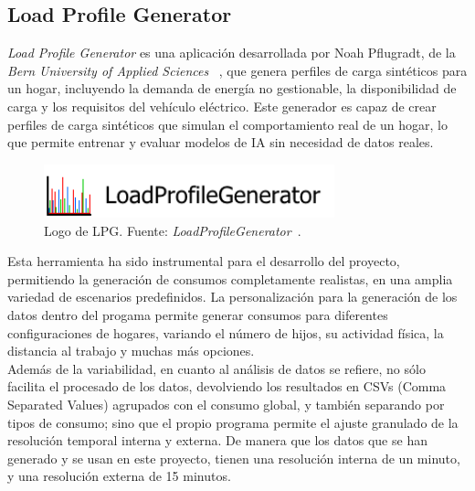 \subsection{Load Profile Generator}
\textit{Load Profile Generator} es una aplicación desarrollada por Noah Pflugradt, de la 
\textit{Bern University of Applied Sciences}~\cite{pflugradt2020loadprofile}
, que genera perfiles de carga sintéticos para un hogar, incluyendo la demanda de energía 
no gestionable, la disponibilidad de carga y los requisitos del vehículo eléctrico. Este 
generador es capaz de crear perfiles de carga sintéticos que simulan el comportamiento 
real de un hogar, lo que permite entrenar y evaluar modelos de IA sin necesidad de datos 
reales.
\begin{figure}[ht]
    \centering
    \includegraphics[width=0.75\textwidth]{images/lpg_logo.png}
    \caption{Logo de LPG. Fuente: \textit{LoadProfileGenerator}~\cite{pflugradt2020loadprofile}.}
    \label{fig:lpg_logo}
\end{figure}

Esta herramienta ha sido instrumental para el desarrollo del proyecto, permitiendo la generación
de consumos completamente realistas, en una amplia variedad de escenarios predefinidos. La 
personalización para la generación de los datos dentro del progama permite generar consumos para
diferentes configuraciones de hogares, variando el número de hijos, su actividad física, la 
distancia al trabajo y muchas más opciones.\\

Además de la variabilidad, en cuanto al análisis de datos se refiere, no sólo facilita el
procesado de los datos, devolviendo los resultados en CSVs (Comma Separated Values) agrupados con 
el consumo global, y también separando por tipos de consumo; sino que el propio programa permite el
ajuste granulado de la resolución temporal interna y externa. De manera que los datos que se han 
generado y se usan en este proyecto, tienen una resolución interna de un minuto, y una resolución 
externa de 15 minutos.

